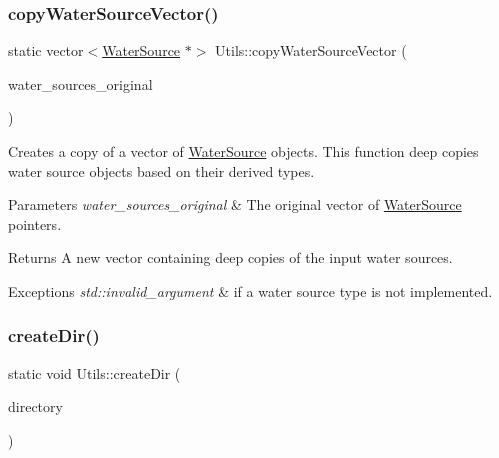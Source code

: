 \subsubsection{\texorpdfstring{copy\+Water\+Source\+Vector()}{copyWaterSourceVector()}}
{\footnotesize\ttfamily static vector$<$\mbox{\hyperlink{classWaterSource}{Water\+Source}} $\ast$$>$ Utils\+::copy\+Water\+Source\+Vector (\begin{DoxyParamCaption}\item[{vector$<$ \mbox{\hyperlink{classWaterSource}{Water\+Source}} $\ast$$>$}]{water\+\_\+sources\+\_\+original }\end{DoxyParamCaption})\hspace{0.3cm}{\ttfamily [static]}}



Creates a copy of a vector of {\ttfamily \mbox{\hyperlink{classWaterSource}{Water\+Source}}} objects. This function deep copies water source objects based on their derived types. 


\begin{DoxyParams}{Parameters}
{\em water\+\_\+sources\+\_\+original} & The original vector of {\ttfamily \mbox{\hyperlink{classWaterSource}{Water\+Source}}} pointers.\\
\hline
\end{DoxyParams}
\begin{DoxyReturn}{Returns}
A new vector containing deep copies of the input water sources.
\end{DoxyReturn}

\begin{DoxyExceptions}{Exceptions}
{\em std\+::invalid\+\_\+argument} & if a water source type is not implemented. \\
\hline
\end{DoxyExceptions}
\mbox{\label{classUtils_a383900ac38ca9c17e58d8ff2156ac100}} 
\subsubsection{\texorpdfstring{create\+Dir()}{createDir()}}
{\footnotesize\ttfamily static void Utils\+::create\+Dir (\begin{DoxyParamCaption}\item[{string}]{directory }\end{DoxyParamCaption})\hspace{0.3cm}{\ttfamily [static]}}



